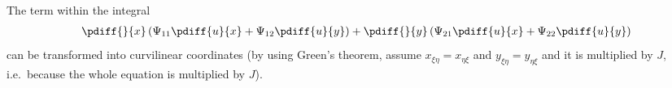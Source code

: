 The term within the integral
\begin{align}
    \pdiff{}{x} \left( \Psi_{11} \pdiff{{u}}{x} + \Psi_{12} \pdiff{{u}}{y}  \right) +
    \pdiff{}{y} \left( \Psi_{21} \pdiff{{u}}{x} + \Psi_{22} \pdiff{{u}}{y}  \right)
\end{align}
can be transformed into curvilinear coordinates (by using Green's theorem, assume $x_{\xi\eta} = x_{\eta\xi}$ and $y_{\xi\eta} = y_{\eta\xi}$ and it is multiplied by $J$, i.e.\ because the whole equation is multiplied by $J$).
%
